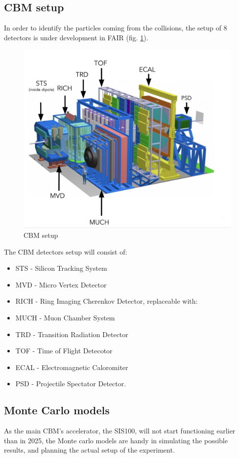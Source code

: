 \subsection{CBM setup}
In order to identify the particles coming from the collisions, the setup of 8 detectors is under development in FAIR (fig. \ref{cbm_setup}).
\begin{figure}[H]
    \centering
    \includegraphics[width=.7\textwidth]{img/cbm_setup.png}
    \caption{CBM setup\cite{progress report}}
    \label{cbm_setup}
\end{figure}
The CBM detectors setup will consist of\cite{progress report}:
\begin{itemize}
    \item STS - Silicon Tracking System
    \item MVD - Micro Vertex Detector
    \item RICH - Ring Imaging Cherenkov Detector, replaceable with:
    \item MUCH - Muon Chamber System
    \item TRD - Transition Radiation Detector
    \item TOF - Time of Flight Detecotor
    \item ECAL - Electromagnetic Caloromiter
    \item PSD - Projectile Spectator Detector.
\end{itemize}

\subsection{Monte Carlo models}
As the main CBM's accelerator, the SIS100, will not start functioning earlier than in 2025, the Monte carlo models are handy in simulating the possible results, and planning the actual setup of the experiment\cite{progress report}.

